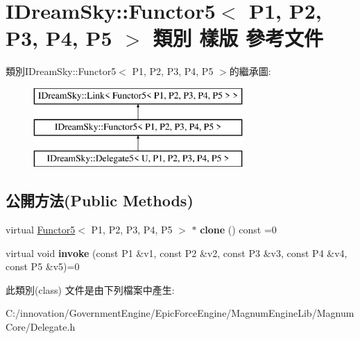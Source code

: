 \hypertarget{class_i_dream_sky_1_1_functor5}{}\section{I\+Dream\+Sky\+:\+:Functor5$<$ P1, P2, P3, P4, P5 $>$ 類別 樣版 參考文件}
\label{class_i_dream_sky_1_1_functor5}
類別\+I\+Dream\+Sky\+:\+:Functor5$<$ P1, P2, P3, P4, P5 $>$的繼承圖\+:\begin{figure}[H]
\begin{center}
\leavevmode
\includegraphics[height=3.000000cm]{class_i_dream_sky_1_1_functor5}
\end{center}
\end{figure}
\subsection*{公開方法(Public Methods)}
\begin{DoxyCompactItemize}
\item 
virtual \hyperlink{class_i_dream_sky_1_1_functor5}{Functor5}$<$ P1, P2, P3, P4, P5 $>$ $\ast$ {\bfseries clone} () const  =0\hypertarget{class_i_dream_sky_1_1_functor5_ad278021b96be9b47000565ba58ebec48}{}\label{class_i_dream_sky_1_1_functor5_ad278021b96be9b47000565ba58ebec48}

\item 
virtual void {\bfseries invoke} (const P1 \&v1, const P2 \&v2, const P3 \&v3, const P4 \&v4, const P5 \&v5)=0\hypertarget{class_i_dream_sky_1_1_functor5_acdc00972be2f6ec8cccb35c829572f5b}{}\label{class_i_dream_sky_1_1_functor5_acdc00972be2f6ec8cccb35c829572f5b}

\end{DoxyCompactItemize}


此類別(class) 文件是由下列檔案中產生\+:\begin{DoxyCompactItemize}
\item 
C\+:/innovation/\+Government\+Engine/\+Epic\+Force\+Engine/\+Magnum\+Engine\+Lib/\+Magnum\+Core/Delegate.\+h\end{DoxyCompactItemize}
